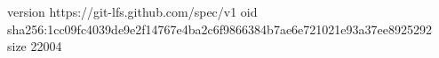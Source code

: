version https://git-lfs.github.com/spec/v1
oid sha256:1cc09fc4039de9e2f14767e4ba2c6f9866384b7ae6e721021e93a37ee8925292
size 22004
